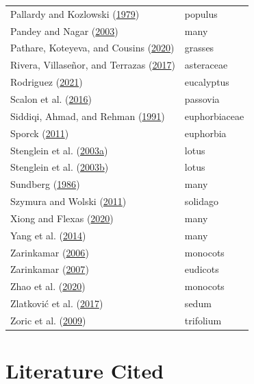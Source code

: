 \documentclass[
  12pt,
]{article}
\begin{document}
\begin{longtable}[]{@{}ll@{}}
Pallardy and Kozlowski (\protect\hyperlink{ref-pallardy_frequency_1979}{1979}) & populus \\
Pandey and Nagar (\protect\hyperlink{ref-pandey_patterns_2003}{2003}) & many \\
Pathare, Koteyeva, and Cousins (\protect\hyperlink{ref-pathare_increased_2020}{2020}) & grasses \\
Rivera, Villaseñor, and Terrazas (\protect\hyperlink{ref-rivera_meso-_2017}{2017}) & asteraceae \\
Rodriguez (\protect\hyperlink{ref-rodriguez_unpublished_2021}{2021}) & eucalyptus \\
Scalon et al. (\protect\hyperlink{ref-scalon_leaf_2016}{2016}) & passovia \\
Siddiqi, Ahmad, and Rehman (\protect\hyperlink{ref-siddiqi_contribution_1991}{1991}) & euphorbiaceae \\
Sporck (\protect\hyperlink{ref-sporck_hawaiian_2011}{2011}) & euphorbia \\
Stenglein et al. (\protect\hyperlink{ref-stenglein_leaf_2003}{2003a}) & lotus \\
Stenglein et al. (\protect\hyperlink{ref-stenglein_leaf_2003-1}{2003b}) & lotus \\
Sundberg (\protect\hyperlink{ref-sundberg_comparison_1986}{1986}) & many \\
Szymura and Wolski (\protect\hyperlink{ref-szymura_leaf_2011}{2011}) & solidago \\
Xiong and Flexas (\protect\hyperlink{ref-xiong_one_2020}{2020}) & many \\
Yang et al. (\protect\hyperlink{ref-yang_large-scale_2014}{2014}) & many \\
Zarinkamar (\protect\hyperlink{ref-zarinkamar_density_2006}{2006}) & monocots \\
Zarinkamar (\protect\hyperlink{ref-zarinkamar_stomatal_2007}{2007}) & eudicots \\
Zhao et al. (\protect\hyperlink{ref-zhao_difference_2020}{2020}) & monocots \\
Zlatković et al. (\protect\hyperlink{ref-zlatkovic_epidermal_2017}{2017}) & sedum \\
Zoric et al. (\protect\hyperlink{ref-zoric_leaf_2009}{2009}) & trifolium \\
\bottomrule()
\end{longtable}

\clearpage

\hypertarget{literature-cited}{%
\section*{Literature Cited}\label{literature-cited}}
\end{document}

